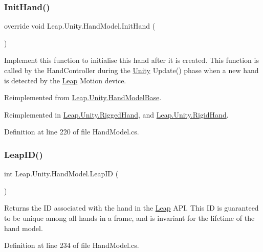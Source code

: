 \subsubsection{\texorpdfstring{InitHand()}{InitHand()}}
{\footnotesize\ttfamily override void Leap.\+Unity.\+Hand\+Model.\+Init\+Hand (\begin{DoxyParamCaption}{ }\end{DoxyParamCaption})\hspace{0.3cm}{\ttfamily [virtual]}}

Implement this function to initialise this hand after it is created. This function is called by the Hand\+Controller during the \mbox{\hyperlink{namespace_leap_1_1_unity}{Unity}} Update() phase when a new hand is detected by the \mbox{\hyperlink{namespace_leap_1_1_unity_1_1_leap}{Leap}} Motion device. 

Reimplemented from \mbox{\hyperlink{class_leap_1_1_unity_1_1_hand_model_base_a4789222f2b16957437c703f15afc1bbf}{Leap.\+Unity.\+Hand\+Model\+Base}}.



Reimplemented in \mbox{\hyperlink{class_leap_1_1_unity_1_1_rigged_hand_a588b2f58a5ffbbfc451ddf8432228507}{Leap.\+Unity.\+Rigged\+Hand}}, and \mbox{\hyperlink{class_leap_1_1_unity_1_1_rigid_hand_a7e76c7f3a3128c1a2e0343a43e177efa}{Leap.\+Unity.\+Rigid\+Hand}}.



Definition at line 220 of file Hand\+Model.\+cs.

\mbox{\label{class_leap_1_1_unity_1_1_hand_model_a08cc8a5aa84e23fd16cd8f104e780b34}} 
\subsubsection{\texorpdfstring{LeapID()}{LeapID()}}
{\footnotesize\ttfamily int Leap.\+Unity.\+Hand\+Model.\+Leap\+ID (\begin{DoxyParamCaption}{ }\end{DoxyParamCaption})}

Returns the ID associated with the hand in the \mbox{\hyperlink{namespace_leap_1_1_unity_1_1_leap}{Leap}} A\+PI. This ID is guaranteed to be unique among all hands in a frame, and is invariant for the lifetime of the hand model. 

Definition at line 234 of file Hand\+Model.\+cs.

